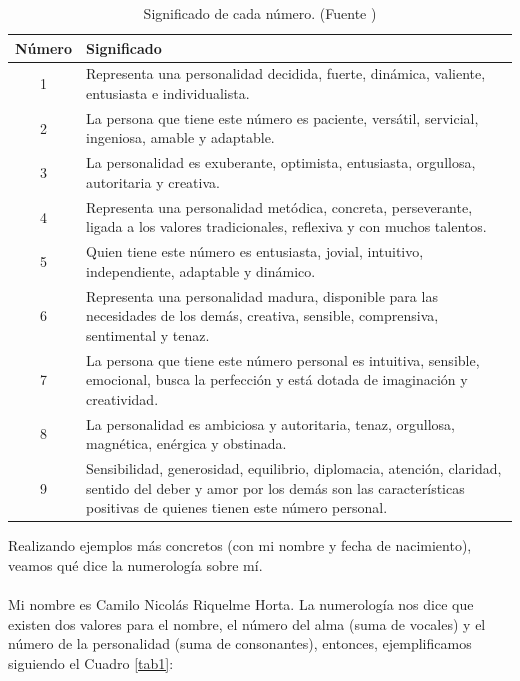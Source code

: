 \documentclass{article}
\begin{document}
	\begin{table}[htbp] %
		\centering
		\begin{tabularx}{\textwidth}{|c|X|} %
			\hline
			Número & Significado\\
			\hline
			1 & Representa una personalidad decidida, fuerte, dinámica, valiente, entusiasta e individualista. \\\hline
			2 & La persona que tiene este número es paciente, versátil, servicial, ingeniosa, amable y adaptable. \\\hline
			3 & La personalidad es exuberante, optimista, entusiasta, orgullosa, autoritaria y creativa. \\\hline
			4 & Representa una personalidad metódica, concreta, perseverante, ligada a los valores tradicionales, reflexiva y con muchos talentos. \\\hline
			5 & Quien tiene este número es entusiasta, jovial, intuitivo, independiente, adaptable y dinámico. \\\hline
			6 & Representa una personalidad madura, disponible para las necesidades de los demás, creativa, sensible, comprensiva, sentimental y tenaz. \\\hline
			7 & La persona que tiene este número personal es intuitiva, sensible, emocional, busca la perfección y está dotada de imaginación y creatividad. \\\hline
			8 & La personalidad es ambiciosa y autoritaria, tenaz, orgullosa, magnética, enérgica y obstinada. \\\hline
			9 & Sensibilidad, generosidad, equilibrio, diplomacia, atención, claridad, sentido del deber y amor por los demás son las características positivas de quienes tienen este número personal. \\\hline
		\end{tabularx}
		\caption{\label{tab2} Significado de cada número. (Fuente \cite{ochoa})}
	\end{table}
	
	Realizando ejemplos más concretos (con mi nombre y fecha de nacimiento), veamos qué dice la numerología sobre mí.\\\\
	Mi nombre es  Camilo Nicolás Riquelme Horta. La numerología nos dice que existen dos valores para el nombre, el número del alma (suma de vocales) y el número de la personalidad (suma de consonantes)\cite{clarin}, entonces, ejemplificamos siguiendo el Cuadro \ref{tab1}:
	
\end{document}
